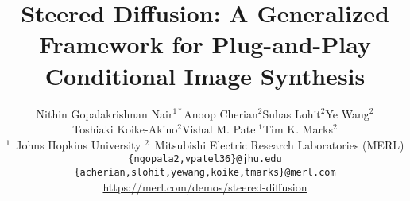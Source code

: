 \documentclass[10pt,twocolumn,letterpaper]{article}
\begin{document}
\title{\vspace{-12pt}
Steered Diffusion: A Generalized Framework for Plug-and-Play\\ Conditional Image Synthesis \vspace{-5mm}}
\author{
Nithin Gopalakrishnan Nair$^{1*}$\quad Anoop Cherian$^{2}$\quad Suhas Lohit$^{2}$\quad Ye Wang$^{2}$\quad \\ Toshiaki Koike-Akino$^{2}$\quad  Vishal M. Patel$^{1}$\quad  Tim K. Marks$^{2}$\quad 
\\
\small{
$^{1}$~Johns Hopkins University\quad
$^{2}$~Mitsubishi Electric Research Laboratories (MERL)
}
\\
{\scriptsize \texttt{\{ngopala2,vpatel36\}@jhu.edu} \quad \texttt{\{acherian,slohit,yewang,koike,tmarks\}@merl.com}} \\
\small{\url{https://merl.com/demos/steered-diffusion}}
\vspace{-0.21cm}
}
\end{document}
